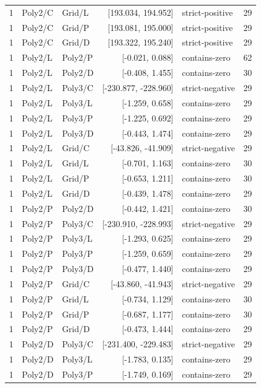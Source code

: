 \begin{longtable}{lllrlr}
1 & Poly2/C & Grid/L & [193.034, 194.952] & strict-positive & 29 \\
1 & Poly2/C & Grid/P & [193.081, 195.000] & strict-positive & 29 \\
1 & Poly2/C & Grid/D & [193.322, 195.240] & strict-positive & 29 \\
1 & Poly2/L & Poly2/P & [-0.021, 0.088] & contains-zero & 62 \\
1 & Poly2/L & Poly2/D & [-0.408, 1.455] & contains-zero & 30 \\
1 & Poly2/L & Poly3/C & [-230.877, -228.960] & strict-negative & 29 \\
1 & Poly2/L & Poly3/L & [-1.259, 0.658] & contains-zero & 29 \\
1 & Poly2/L & Poly3/P & [-1.225, 0.692] & contains-zero & 29 \\
1 & Poly2/L & Poly3/D & [-0.443, 1.474] & contains-zero & 29 \\
1 & Poly2/L & Grid/C & [-43.826, -41.909] & strict-negative & 29 \\
1 & Poly2/L & Grid/L & [-0.701, 1.163] & contains-zero & 30 \\
1 & Poly2/L & Grid/P & [-0.653, 1.211] & contains-zero & 30 \\
1 & Poly2/L & Grid/D & [-0.439, 1.478] & contains-zero & 29 \\
1 & Poly2/P & Poly2/D & [-0.442, 1.421] & contains-zero & 30 \\
1 & Poly2/P & Poly3/C & [-230.910, -228.993] & strict-negative & 29 \\
1 & Poly2/P & Poly3/L & [-1.293, 0.625] & contains-zero & 29 \\
1 & Poly2/P & Poly3/P & [-1.259, 0.659] & contains-zero & 29 \\
1 & Poly2/P & Poly3/D & [-0.477, 1.440] & contains-zero & 29 \\
1 & Poly2/P & Grid/C & [-43.860, -41.943] & strict-negative & 29 \\
1 & Poly2/P & Grid/L & [-0.734, 1.129] & contains-zero & 30 \\
1 & Poly2/P & Grid/P & [-0.687, 1.177] & contains-zero & 30 \\
1 & Poly2/P & Grid/D & [-0.473, 1.444] & contains-zero & 29 \\
1 & Poly2/D & Poly3/C & [-231.400, -229.483] & strict-negative & 29 \\
1 & Poly2/D & Poly3/L & [-1.783, 0.135] & contains-zero & 29 \\
1 & Poly2/D & Poly3/P & [-1.749, 0.169] & contains-zero & 29 \\

\end{longtable}
